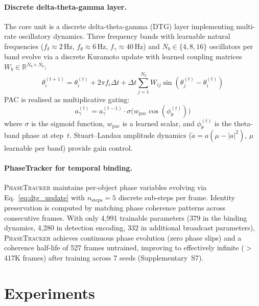 \documentclass[11pt]{article}
\providecommand{\pt}{\textnormal{\textsc{PhaseTracker}}\xspace}
\providecommand{\R}{\mathbb{R}}
\begin{document}
\paragraph{Discrete delta-theta-gamma layer.}
The core unit is a discrete delta-theta-gamma (DTG) layer implementing
multi-rate oscillatory dynamics.  Three frequency bands with learnable
natural frequencies ($f_\delta \approx 2$\,Hz, $f_\theta \approx 6$\,Hz,
$f_\gamma \approx 40$\,Hz) and $N_b \in \{4, 8, 16\}$ oscillators per
band evolve via a discrete Kuramoto update with learned
coupling matrices $W_b \in \R^{N_b \times N_b}$:
\begin{equation}
  \theta_i^{(t+1)} = \theta_i^{(t)} + 2\pi f_i \Delta t
  + \Delta t \sum_{j=1}^{N_b} W_{ij} \sin(\theta_j^{(t)} - \theta_i^{(t)})
  \label{eq:dtg_update}
\end{equation}
PAC is realised as multiplicative gating:
\begin{equation}
  a_\gamma^{(t)} = a_\gamma^{(t-1)}
  \cdot \sigma\!\bigl(w_{\text{pac}} \cos(\phi_\theta^{(t)})\bigr)
  \label{eq:pac}
\end{equation}
where $\sigma$ is the sigmoid function, $w_{\text{pac}}$ is a learned
scalar, and $\phi_\theta^{(t)}$ is the theta-band phase at step~$t$.
Stuart--Landau amplitude dynamics ($\dot{a} = a(\mu - |a|^2)$,
$\mu$ learnable per band) provide gain control.

\paragraph{PhaseTracker for temporal binding.}
\pt maintains per-object phase variables evolving via
Eq.~\eqref{eq:dtg_update} with $n_{\text{steps}} = 5$ discrete
sub-steps per frame.
Identity preservation is computed by matching phase coherence patterns
across consecutive frames.  With only 4{,}991 trainable parameters
(379 in the binding dynamics, 4{,}280 in detection encoding,
332 in additional broadcast parameters),
\pt achieves continuous phase evolution (zero phase slips) and a
coherence half-life of 527 frames untrained, improving to
effectively infinite ($>$417K frames) after training
across 7 seeds (Supplementary~S7).

\section{Experiments}
\label{sec:experiments}
\end{document}
